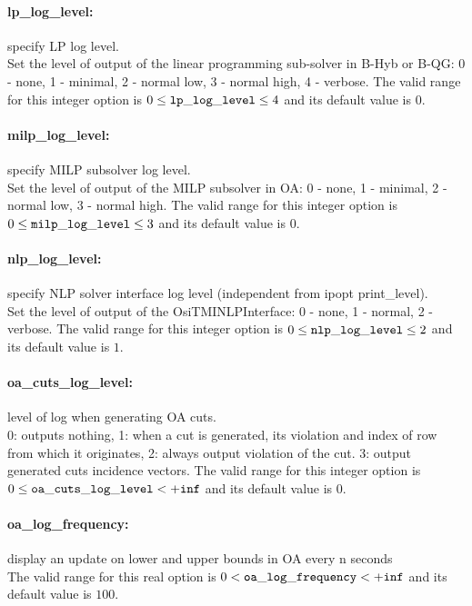 \paragraph{lp\_log\_level:}\label{sec:lp_log_level} specify LP log level. $\;$ \\
 Set the level of output of the linear programming
sub-solver in B-Hyb or B-QG: 0 - none, 1 -
minimal, 2 - normal low, 3 - normal high, 4 -
verbose. The valid range for this integer option is
$0 \le {\tt lp\_log\_level } \le 4$
and its default value is $0$.


\paragraph{milp\_log\_level:}\label{sec:milp_log_level} specify MILP subsolver log level. $\;$ \\
 Set the level of output of the MILP subsolver in
OA: 0 - none, 1 - minimal, 2 - normal low, 3 -
normal high. The valid range for this integer option is
$0 \le {\tt milp\_log\_level } \le 3$
and its default value is $0$.


\paragraph{nlp\_log\_level:}\label{sec:nlp_log_level} specify NLP solver interface log level (independent from ipopt print\_level). $\;$ \\
 Set the level of output of the OsiTMINLPInterface: 0 - none, 1 - normal, 2 - verbose. The valid range for this integer option is
$0 \le {\tt nlp\_log\_level } \le 2$
and its default value is $1$.


\paragraph{oa\_cuts\_log\_level:}\label{sec:oa_cuts_log_level} level of log when generating OA cuts. $\;$ \\
 0: outputs nothing,
1: when a cut is generated,
its violation and index of row from which it
originates,
2: always output violation of the
cut.
3: output generated cuts incidence vectors. The valid range for this integer option is
$0 \le {\tt oa\_cuts\_log\_level } <  {\tt +inf}$
and its default value is $0$.


\paragraph{oa\_log\_frequency:}\label{sec:oa_log_frequency} display an update on lower and upper bounds in OA every n seconds $\;$ \\
 The valid range for this real option is 
$0 <  {\tt oa\_log\_frequency } <  {\tt +inf}$
and its default value is $100$.


